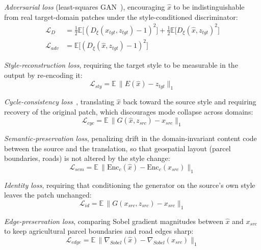 \documentclass[runningheads]{llncs}
\begin{document}
\emph{Adversarial loss} (least-squares GAN~\cite{mao2017lsgan}), encouraging $\hat{x}$ to be indistinguishable from real target-domain patches under the style-conditioned discriminator:
\begin{align}
\mathcal{L}_D &= \tfrac{1}{2}\mathbb{E}\big[(D_\xi(x_{tgt}, z_{tgt}) - 1)^2\big] + \tfrac{1}{2}\mathbb{E}\big[D_\xi(\hat{x}, z_{tgt})^2\big] \\
\mathcal{L}_{adv} &= \mathbb{E}\big[(D_\xi(\hat{x}, z_{tgt}) - 1)^2\big]
\label{eq:adv}
\end{align}

\emph{Style-reconstruction loss}, requiring the target style to be measurable in the output by re-encoding it:
\begin{equation}
\mathcal{L}_{sty} = \mathbb{E}\,\lVert E(\hat{x}) - z_{tgt} \rVert_1
\label{eq:sty}
\end{equation}

\emph{Cycle-consistency loss}~\cite{zhu2017cyclegan}, translating $\hat{x}$ back toward the source style and requiring recovery of the original patch, which discourages mode collapse across domains:
\begin{equation}
\mathcal{L}_{cyc} = \mathbb{E}\,\lVert G(\hat{x}, z_{src}) - x_{src} \rVert_1
\label{eq:cyc}
\end{equation}

\emph{Semantic-preservation loss}, penalizing drift in the domain-invariant content code between the source and the translation, so that geospatial layout (parcel boundaries, roads) is not altered by the style change:
\begin{equation}
\mathcal{L}_{sem} = \mathbb{E}\,\lVert \mathrm{Enc}_c(\hat{x}) - \mathrm{Enc}_c(x_{src}) \rVert_1
\label{eq:sem}
\end{equation}

\emph{Identity loss}, requiring that conditioning the generator on the source's own style leaves the patch unchanged:
\begin{equation}
\mathcal{L}_{id} = \mathbb{E}\,\lVert G(x_{src}, z_{src}) - x_{src} \rVert_1
\label{eq:id}
\end{equation}

\emph{Edge-preservation loss}, comparing Sobel gradient magnitudes between $\hat{x}$ and $x_{src}$ to keep agricultural parcel boundaries and road edges sharp:
\begin{equation}
\mathcal{L}_{edge} = \mathbb{E}\,\lVert \nabla_{Sobel}(\hat{x}) - \nabla_{Sobel}(x_{src}) \rVert_1
\label{eq:edge}
\end{equation}
\end{document}
